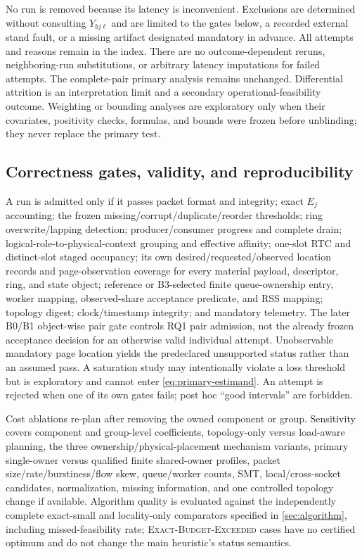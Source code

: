No run is removed because its latency is inconvenient. Exclusions are determined without consulting $Y_{bj\ell}$ and are limited to the gates below, a recorded external stand fault, or a missing artifact designated mandatory in advance. All attempts and reasons remain in the index. There are no outcome-dependent reruns, neighboring-run substitutions, or arbitrary latency imputations for failed attempts. The complete-pair primary analysis remains unchanged. Differential attrition is an interpretation limit and a secondary operational-feasibility outcome. Weighting or bounding analyses are exploratory only when their covariates, positivity checks, formulas, and bounds were frozen before unblinding; they never replace the primary test.

\subsection{Correctness gates, validity, and reproducibility}

A run is admitted only if it passes packet format and integrity; exact $E_j$ accounting; the frozen missing/corrupt/duplicate/reorder thresholds; ring overwrite/lapping detection; producer/consumer progress and complete drain; logical-role-to-physical-context grouping and effective affinity; one-slot RTC and distinct-slot staged occupancy; its own desired/requested/observed location records and page-observation coverage for every material payload, descriptor, ring, and state object; reference or B3-selected finite queue-ownership entry, worker mapping, observed-share acceptance predicate, and RSS mapping; topology digest; clock/timestamp integrity; and mandatory telemetry. The later B0/B1 object-wise pair gate controls RQ1 pair admission, not the already frozen acceptance decision for an otherwise valid individual attempt. Unobservable mandatory page location yields the predeclared unsupported status rather than an assumed pass. A saturation study may intentionally violate a loss threshold but is exploratory and cannot enter \cref{eq:primary-estimand}. An attempt is rejected when one of its own gates fails; post hoc ``good intervals'' are forbidden.

Cost ablations re-plan after removing the owned component or group. Sensitivity covers component and group-level coefficients, topology-only versus load-aware planning, the three ownership/physical-placement mechanism variants, primary single-owner versus qualified finite shared-owner profiles, packet size/rate/burstiness/flow skew, queue/worker counts, SMT, local/cross-socket candidates, normalization, missing information, and one controlled topology change if available. Algorithm quality is evaluated against the independently complete exact-small and locality-only comparators specified in \cref{sec:algorithm}, including missed-feasibility rate; \textsc{Exact-Budget-Exceeded} cases have no certified optimum and do not change the main heuristic's status semantics.

